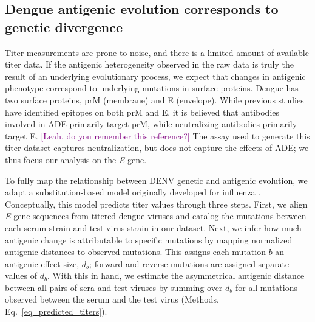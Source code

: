 \documentclass[11pt,oneside,letterpaper]{article}
\def\sbc#1{\textcolor{purple}{[#1]}}
\begin{document}
\subsection*{Dengue antigenic evolution corresponds to genetic divergence}
Titer measurements are prone to noise, and there is a limited amount of available titer data.
If the antigenic heterogeneity observed in the raw data is truly the result of an underlying evolutionary process, we expect that changes in antigenic phenotype correspond to underlying mutations in surface proteins.
Dengue has two surface proteins, prM (membrane) and E (envelope).
While previous studies have identified epitopes on both prM and E, it is believed that antibodies involved in ADE primarily target prM, while neutralizing antibodies primarily target E. \sbc{Leah, do you remember this reference?}
The assay used to generate this titer dataset captures neutralization, but does not capture the effects of ADE; we thus focus our analysis on the \textit{E} gene.

To fully map the relationship between DENV genetic and antigenic evolution, we adapt a substitution-based model originally developed for influenza \citep{neher2016prediction}.
Conceptually, this model predicts titer values through three steps.
First, we align \textit{E} gene sequences from titered dengue viruses and catalog the mutations between each serum strain and test virus strain in our dataset.
Next, we infer how much antigenic change is attributable to specific mutations by mapping normalized antigenic distances to observed mutations.
This assigns each mutation $b$ an antigenic effect size, $d_b$; forward and reverse mutations are assigned separate values of $d_b$.
With this in hand, we estimate the asymmetrical antigenic distance between all pairs of sera and test viruses by summing over $d_b$ for all mutations observed between the serum and the test virus (Methods, Eq.~\ref{eq_predicted_titers}).
\end{document}
